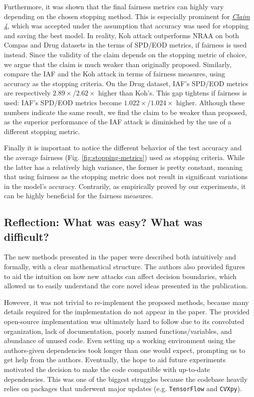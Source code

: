 Furthermore, it was shown that the final fairness metrics can highly vary depending on the chosen stopping method. This is especially prominent for \hyperlink{claim-4}{\textit{Claim 4}}, which was accepted under the assumption that accuracy was used for stopping and saving the best model. In reality, Koh attack outperforms NRAA on both Compas and Drug datasets in the terms of SPD/EOD metrics, if fairness is used instead. Since the validity of the claim depends on the stopping metric of choice, we argue that the claim is much weaker than originally proposed. Similarly, compare the IAF and the Koh attack in terms of fairness measures, using accuracy as the stopping criteria. On the Drug dataset, IAF's SPD/EOD metrics are respectively $2.89\times$/$2.62\times$ higher than Koh's. This gap tightens if fairness is used: IAF's SPD/EOD metrics become $1.022\times$/$1.024\times$ higher. Although these numbers indicate the same result, we find the claim to be weaker than proposed, as the superior performance of the IAF attack is diminished by the use of a different stopping metric.

Finally it is important to notice the different behavior of the test accuracy and the average fairness (Fig. \ref{fig:stopping-metrics}) used as stopping criteria. While the latter has a relatively high variance, the former is pretty constant, meaning that using fairness as the stopping metric does not result in significant variations in the model's accuracy. Contrarily, as empirically proved by our experiments, it can be highly beneficial for the fairness measures. 

\subsection{Reflection: What was easy? What was difficult?}
The new methods presented in the paper were described both intuitively and formally, with a clear mathematical structure. The authors also provided figures to aid the intuition on how new attacks can affect decision boundaries, which allowed us to easily understand the core novel ideas presented in the publication.

However, it was not trivial to re-implement the proposed methods, because many details required for the implementation do not appear in the paper. The provided open-source implementation was ultimately hard to follow due to its convoluted organization, lack of documentation, poorly named functions/variables, and abundance of unused code. Even setting up a working environment using the authors-given dependencies took longer than one would expect, prompting us to get help from the authors. Eventually, the hope to aid future experiments motivated the decision to make the code compatible with up-to-date dependencies. This was one of the biggest struggles because the codebase heavily relies on packages that underwent major updates (e.g. \texttt{TensorFlow} and \texttt{CVXpy}).

